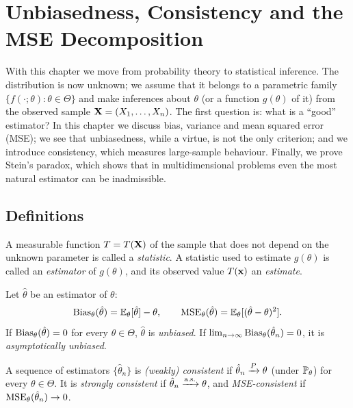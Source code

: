 \documentclass[main.tex]{subfiles}
\begin{document}
\chapter{Unbiasedness, Consistency and the MSE Decomposition}\label{ch:nokta-tahmin}

With this chapter we move from probability theory to statistical inference. The distribution is now unknown; we assume that it belongs to a parametric family $\{f(\cdot;\theta):\theta\in\Theta\}$ and make inferences about $\theta$ (or a function $g(\theta)$ of it) from the observed sample $\X=(X_1,\dots,X_n)$. The first question is: what is a ``good'' estimator? In this chapter we discuss bias, variance and mean squared error (MSE); we see that unbiasedness, while a virtue, is not the only criterion; and we introduce consistency, which measures large-sample behaviour. Finally, we prove Stein's paradox, which shows that in multidimensional problems even the most natural estimator can be inadmissible.

\section{Definitions}

\begin{definition}
A measurable function $T=T(\X)$ of the sample that does not depend on the unknown parameter is called a \emph{statistic}. A statistic used to estimate $g(\theta)$ is called an \emph{estimator} of $g(\theta)$, and its observed value $T(\x)$ an \emph{estimate}.
\end{definition}

\begin{definition}
Let $\hat\theta$ be an estimator of $\theta$:
\[
\Bias_\theta(\hat{\theta}) = \E_\theta[\hat{\theta}] - \theta,\qquad \MSE_\theta(\hat{\theta}) = \E_\theta[(\hat{\theta} - \theta)^2].
\]
If $\Bias_\theta(\hat\theta)=0$ for every $\theta\in\Theta$, $\hat\theta$ is \emph{unbiased}. If $\lim_{n\to\infty}\Bias_\theta(\hat\theta_n)=0$, it is \emph{asymptotically unbiased}.
\end{definition}

\begin{definition}[Consistency]
A sequence of estimators $\{\hat\theta_n\}$ is \emph{(weakly) consistent} if $\hat\theta_n\pto\theta$ (under $\P_\theta$) for every $\theta\in\Theta$. It is \emph{strongly consistent} if $\hat\theta_n\asto\theta$, and \emph{MSE-consistent} if $\MSE_\theta(\hat\theta_n)\to0$.
\end{definition}
\end{document}
